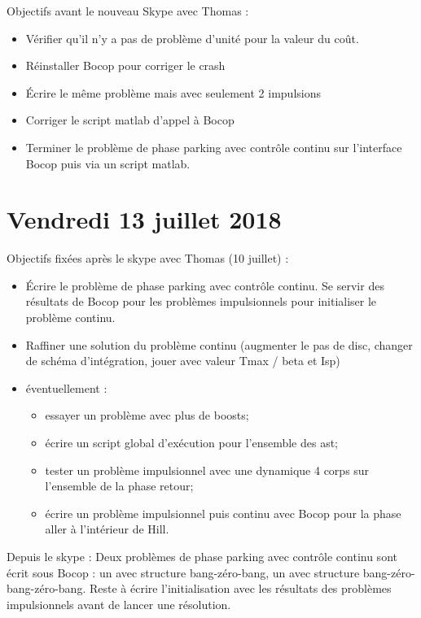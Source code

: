 \documentclass[fleqn,%
a4paper,11pt]{scrbook}
\begin{document}
Objectifs avant le nouveau Skype avec Thomas :
	\begin{itemize}
		\item Vérifier qu'il n'y a pas de problème d'unité pour la valeur du coût.
		\item Réinstaller Bocop pour corriger le crash
		\item Écrire le même problème mais avec seulement 2 impulsions
		\item Corriger le script matlab d'appel à Bocop
		\item Terminer le problème de phase parking avec contrôle continu sur l'interface Bocop puis via un script matlab.
	\end{itemize}
	
\section*{Vendredi 13 juillet 2018}
	Objectifs fixées après le skype avec Thomas (10 juillet) :
	\begin{itemize}
		\item Écrire le problème de phase parking avec contrôle continu. Se servir des résultats de Bocop pour les problèmes impulsionnels pour initialiser le problème continu.
		\item Raffiner une solution du problème continu (augmenter le pas de disc, changer de schéma d'intégration, jouer avec valeur Tmax / beta  et Isp)
		\item éventuellement :
			\begin{itemize}
				\item essayer un problème avec plus de boosts;
				\item écrire un script global d'exécution pour l'ensemble des ast;
				\item tester un problème impulsionnel avec une dynamique 4 corps sur l'ensemble de la phase retour;
				\item écrire un problème impulsionnel puis continu avec Bocop pour la phase aller à l'intérieur de Hill.
			\end{itemize}
	\end{itemize}
	
	Depuis le skype : Deux problèmes de phase parking avec contrôle continu sont écrit sous Bocop : un avec structure bang-zéro-bang, un avec structure bang-zéro-bang-zéro-bang. Reste à écrire l'initialisation avec les résultats des problèmes impulsionnels avant de lancer une résolution.
\end{document}

